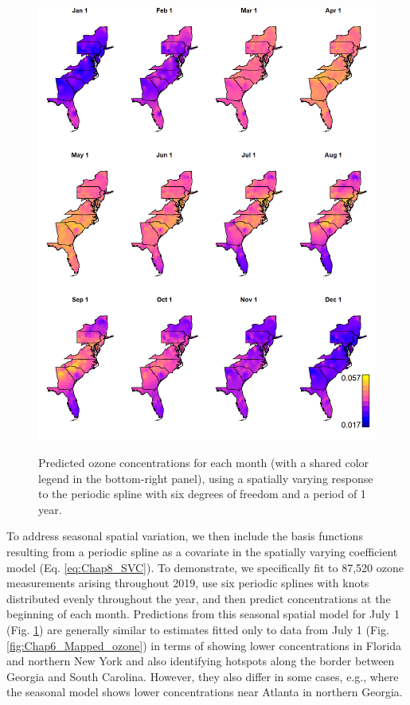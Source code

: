 \begin{figure}[!ht]
    \caption[Seasonal predictions of ozone concentration in 2019]{Predicted ozone concentrations for each month (with a shared color legend in the bottom-right panel), using a spatially varying response to the periodic spline with six degrees of freedom and a period of 1 year.}
    \centering
    \includegraphics[width=5.5in]{Chap_8/Seasonal_ozone.png}
    \label{fig:Chap8_seasonal_ozone}
\end{figure}

To address seasonal spatial variation, we then include the basis functions resulting from a periodic spline as a covariate in the spatially varying coefficient model (Eq. \ref{eq:Chap8_SVC}). To demonstrate, we specifically fit to 87,520 ozone measurements arising throughout 2019, use six periodic splines with knots distributed evenly throughout the year, and then predict concentrations at the beginning of each month.  Predictions from this seasonal spatial model for July 1 (Fig. \ref{fig:Chap8_seasonal_ozone}) are generally similar to estimates fitted only to data from July 1 (Fig. \ref{fig:Chap6_Mapped_ozone}) in terms of showing lower concentrations in Florida and northern New York and also identifying hotspots along the border between Georgia and South Carolina.  However, they also differ in some cases, e.g., where the seasonal model shows lower concentrations near Atlanta in northern Georgia.  

